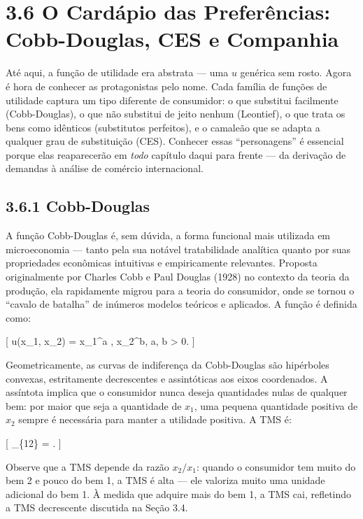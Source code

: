\documentclass[11pt,twoside,openright]{book}
\begin{document}
\section{3.6 O Cardápio das Preferências: Cobb-Douglas, CES e
Companhia}\label{o-carduxe1pio-das-preferuxeancias-cobb-douglas-ces-e-companhia}

Até aqui, a função de utilidade era abstrata --- uma \(u\) genérica sem
rosto. Agora é hora de conhecer as protagonistas pelo nome. Cada família
de funções de utilidade captura um tipo diferente de consumidor: o que
substitui facilmente (Cobb-Douglas), o que não substitui de jeito nenhum
(Leontief), o que trata os bens como idênticos (substitutos perfeitos),
e o camaleão que se adapta a qualquer grau de substituição (CES).
Conhecer essas ``personagens'' é essencial porque elas reaparecerão em
\emph{todo} capítulo daqui para frente --- da derivação de demandas à
análise de comércio internacional.

\subsection{3.6.1 Cobb-Douglas}\label{cobb-douglas}

A função Cobb-Douglas é, sem dúvida, a forma funcional mais utilizada em
microeconomia --- tanto pela sua notável tratabilidade analítica quanto
por suas propriedades econômicas intuitivas e empiricamente relevantes.
Proposta originalmente por Charles Cobb e Paul Douglas (1928) no
contexto da teoria da produção, ela rapidamente migrou para a teoria do
consumidor, onde se tornou o ``cavalo de batalha'' de inúmeros modelos
teóricos e aplicados. A função é definida como:

{[} u(x\_1, x\_2) = x\_1\^{}a , x\_2\^{}b, \quad a, b \textgreater{} 0.
\label{eq:3.6.5}  {]}

Geometricamente, as curvas de indiferença da Cobb-Douglas são hipérboles
convexas, estritamente decrescentes e assintóticas aos eixos
coordenados. A assíntota implica que o consumidor nunca deseja
quantidades nulas de qualquer bem: por maior que seja a quantidade de
\(x_1\), uma pequena quantidade positiva de \(x_2\) sempre é necessária
para manter a utilidade positiva. A TMS é:

{[} \_\{12\} = . \label{eq:3.6.6}
 {]}

Observe que a TMS depende da razão \(x_2/x_1\): quando o consumidor tem
muito do bem 2 e pouco do bem 1, a TMS é alta --- ele valoriza muito uma
unidade adicional do bem 1. À medida que adquire mais do bem 1, a TMS
cai, refletindo a TMS decrescente discutida na Seção 3.4.
\end{document}
